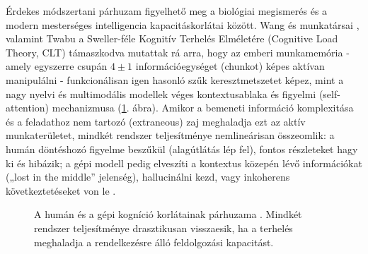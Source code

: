 \documentclass[12pt,a4paper,oneside]{book}
\begin{document}
Érdekes módszertani párhuzam figyelhető meg a biológiai megismerés és a modern mesterséges intelligencia kapacitáskorlátai között. Wang és munkatársai \cite{wang2026}, valamint Twabu \cite{twabu2025} a Sweller-féle Kognitív Terhelés Elméletére (Cognitive Load Theory, CLT) \cite{sweller2011} támaszkodva mutattak rá arra, hogy az emberi munkamemória - amely egyszerre csupán $4 \pm 1$ információegységet (chunkot) képes aktívan manipulálni \cite{cowan2010} - funkcionálisan igen hasonló szűk keresztmetszetet képez, mint a nagy nyelvi és multimodális modellek véges kontextusablaka és figyelmi (self-attention) mechanizmusa (\ref{fig:cognitive_limits}. ábra). Amikor a bemeneti információ komplexitása és a feladathoz nem tartozó (extraneous) zaj meghaladja ezt az aktív munkaterületet, mindkét rendszer teljesítménye nemlineárisan összeomlik: a humán döntéshozó figyelme beszűkül (alagútlátás lép fel), fontos részleteket hagy ki és hibázik; a gépi modell pedig elveszíti a kontextus közepén lévő információkat („lost in the middle” jelenség), hallucinálni kezd, vagy inkoherens következtetéseket von le \cite{wang2026}.

\begin{figure}[H]
    \centering
    \caption{A humán és a gépi kogníció korlátainak párhuzama \cite{wang2026}. Mindkét rendszer teljesítménye drasztikusan visszaesik, ha a terhelés meghaladja a rendelkezésre álló feldolgozási kapacitást.}
    \label{fig:cognitive_limits}
\end{figure}
\end{document}
